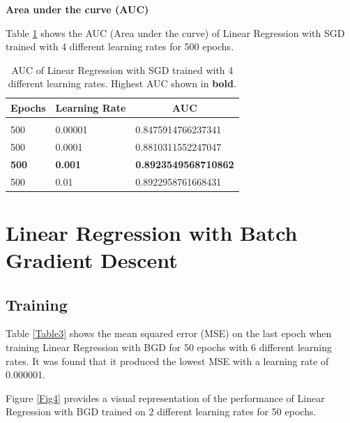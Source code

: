 \documentclass{article} %
\begin{document}
\textbf{Area under the curve (AUC)}

Table \ref{Table2} shows the AUC (Area under the curve) of Linear Regression with SGD trained with 4 different learning rates for 500 epochs.

\begin{table}[ht]
\caption{AUC of Linear Regression with SGD trained with 4 different learning rates. Highest AUC shown in \textbf{bold}.}
\label{Table2}
\begin{center}
\begin{tabular}{l l l}
\multicolumn{1}{c}{\bf Epochs} &\multicolumn{1}{c}{\bf Learning Rate} &\multicolumn{1}{c}{\bf AUC}
\\ \hline \\

500 & 0.00001 & 0.8475914766237341\\
500 & 0.0001  & 0.8810311552247047\\

\textbf{500} & \textbf{0.001} & \textbf{0.8923549568710862}\\

500 & 0.01    & 0.8922958761668431\\

\end{tabular}
\end{center}
\end{table}

\clearpage

\section{Linear Regression with Batch Gradient Descent \cite{ng2000cs229} \cite{roc_curve}}

\subsection{Training}

Table \ref{Table3} shows the mean squared error (MSE) on the last epoch when training Linear Regression with BGD for 50 epochs with 6 different learning rates. It was found that it produced the lowest MSE with a learning rate of 0.000001.

Figure \ref{Fig4} provides a visual representation of the performance of Linear Regression with BGD trained on 2 different learning rates for 50 epochs.
\end{document}
